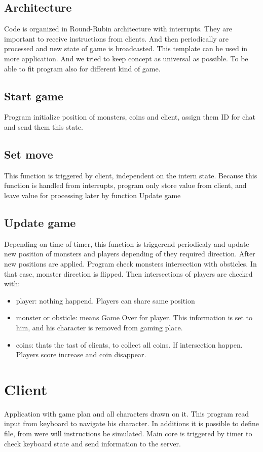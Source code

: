 \documentclass[times, 10pt,twocolumn]{article}
\begin{document}
\subsection{Architecture}
Code is organized in Round-Rubin architecture with interrupts. They are important to receive instructions from clients. And then periodically are processed and new state of game is broadcasted. This template can be used in more application. And we tried to keep concept as universal as possible. To be able to fit program also for different kind of game.

\subsection{Start game}
Program initialize position of monsters, coins and client, assign them ID for chat and send them this state.

\subsection{Set move}
This function is triggered by client, independent on the intern state. Because this function is handled from interrupts, program only store value from client, and leave value for processing later by function Update game

\subsection{Update game}
Depending on time of timer, this function is triggerend periodicaly and update new position of monsters and players depending of they required direction. After new positions are applied. Program check monsters intersection with obsticles. In that case, monster direction is flipped. Then intersections of players are checked with:
\begin{itemize}
	\item player: nothing happend. Players can share same position
	\item monster or obsticle: means Game Over for player. This information is set to him, and his character is removed from gaming place.
	\item coins: thats the tast of clients, to collect all coins. If intersection happen. Players score increase and coin disappear.
\end{itemize}

\section{Client}
Application with game plan and all characters drawn on it. This program read input from keyboard to navigate his character. In additions it is possible to define file, from were will instructions be simulated. Main core is triggered by timer to check keyboard state and send information to the server.
\end{document}
